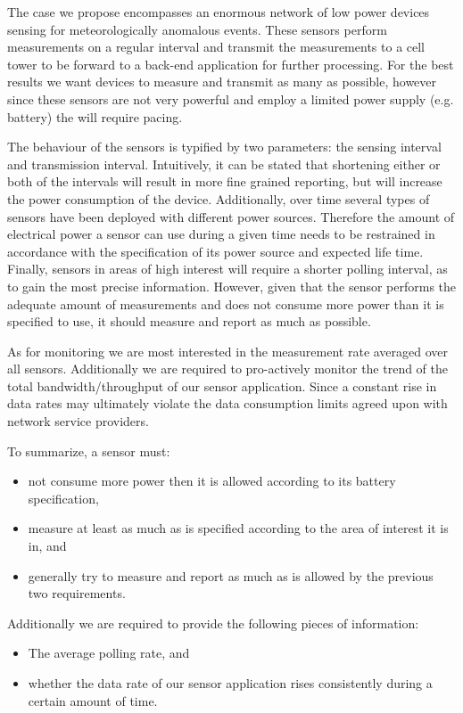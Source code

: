 The case we propose encompasses an enormous network of low power devices sensing for meteorologically anomalous events. These sensors perform measurements on a regular interval and transmit the measurements to a cell tower to be forward to a back-end application for further processing. For the best results we want devices to measure and transmit as many as possible, however since these sensors are not very powerful and employ a limited power supply (e.g. battery) the will require pacing.

The behaviour of the sensors is typified by two parameters: the sensing interval and transmission interval. Intuitively, it can be stated that shortening either or both of the intervals will result in more fine grained reporting, but will increase the power consumption of the device. Additionally, over time several types of sensors have been deployed with different power sources. Therefore the amount of electrical power a sensor can use during a given time needs to be restrained in accordance with the specification of its power source and expected life time. Finally, sensors in areas of high interest will require a shorter polling interval, as to gain the most precise information. However, given that the sensor performs the adequate amount of measurements and does not consume more power than it is specified to use, it should measure and report as much as possible.

As for monitoring we are most interested in the measurement rate averaged over all sensors. Additionally we are required to pro-actively monitor the trend of the total bandwidth/throughput of our sensor application. Since a constant rise in data rates may ultimately violate the data consumption limits agreed upon with network service providers.

To summarize, a sensor must:
\begin{itemize}
\nospace
\item not consume more power then it is allowed according to its battery specification,
\item measure at least as much as is specified according to the area of interest it is in, and
\item generally try to measure and report as much as is allowed by the previous two requirements.
\end{itemize}
Additionally we are required to provide the following pieces of information:
\begin{itemize}
\nospace
\item The average polling rate, and
\item whether the data rate of our sensor application rises consistently during a certain amount of time.
\end{itemize}

